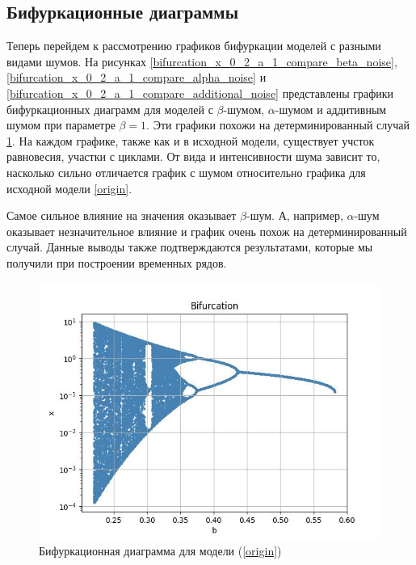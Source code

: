 \subsection{Бифуркационные диаграммы}

        Теперь перейдем к рассмотрению графиков бифуркации моделей с разными видами шумов. На рисунках \ref{bifurcation_x_0_2_a_1_compare_beta_noise}, \ref{bifurcation_x_0_2_a_1_compare_alpha_noise} и \ref{bifurcation_x_0_2_a_1_compare_additional_noise} представлены графики бифуркационных диаграмм для моделей с \(\beta\)-шумом, \(\alpha\)-шумом и аддитивным шумом при параметре \(\beta = 1\). Эти графики похожи на детерминированный случай \ref{bifurcation_x_0_2_a_1_compare_no_noise}. На каждом графике, также как и в исходной модели, существует учсток равновесия, участки с циклами. От вида и интенсивности шума зависит то, насколько сильно отличается график с шумом относительно графика для исходной модели \ref{origin}. 

        Самое сильное влияние на значения оказывает \(\beta\)-шум. А, например, \(\alpha\)-шум оказывает незначительное влияние и график очень похож на детерминированный случай. Данные выводы также подтверждаются результатами, которые мы получили при построении временных рядов.


        \begin{figure}
            \centering
            \includegraphics[width=\textwidth]{stochastic/images/bifurcation_x_0_2_a_1_compare_no_noise.jpg}
        
            \captionsetup{justification=centering}
            \caption{Бифуркационная диаграмма для модели (\ref{origin})}
            \label{bifurcation_x_0_2_a_1_compare_no_noise}
        \end{figure}

